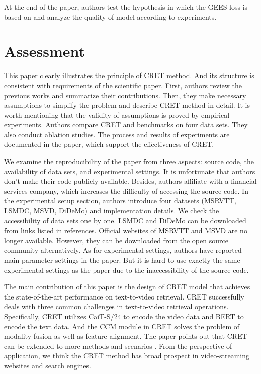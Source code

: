 \documentclass{article}
\begin{document}
At the end of the paper, authors test the hypothesis in which the GEES loss is based on and analyze the quality of model according to experiments.

\section{Assessment}
This paper clearly illustrates the principle of CRET method. And its structure is consistent with requirements of the scientific paper. First, authors review the previous works and summarize their contributions. Then, they make necessary assumptions to simplify the problem and describe CRET method in detail. It is worth mentioning that the validity of assumptions is proved by empirical experiments. Authors compare CRET and benchmarks on four data sets. They also conduct ablation studies. The process and results of experiments are documented in the paper, which support the effectiveness of CRET.

We examine the reproducibility of the paper from three aspects: source code, the availability of data sets, and experimental settings. It is unfortunate that authors don't make their code publicly available. Besides, authors affiliate with a financial services company, which increases the difficulty of accessing the source code. In the experimental setup section, authors introduce four datasets (MSRVTT, LSMDC, MSVD, DiDeMo) and implementation details. We check the accessibility of data sets one by one. LSMDC and DiDeMo can be downloaded from links listed in references. Official websites of MSRVTT and MSVD are no longer available. However, they can be downloaded from the open source community alternatively. As for experimental settings, authors have reported main parameter settings in the paper. But it is hard to use exactly the same experimental settings as the paper due to the inaccessibility of the source code.

The main contribution of this paper is the design of CRET model that achieves the state-of-the-art performance on text-to-video retrieval. CRET successfully deals with three common challenges in text-to-video retrieval operations. Specifically, CRET utilizes CaiT-S/24 to encode the video data and BERT to encode the text data. And the CCM module in CRET solves the problem of modality fusion as well as feature alignment. The paper points out that CRET can be extended to more methods and scenarios \cite{cret}. From the perspective of application, we think the CRET method has broad prospect in video-streaming websites and search engines.
\end{document}
